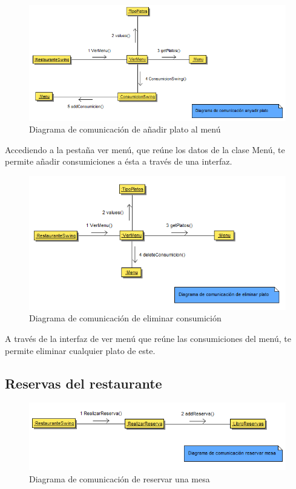 \documentclass[spanish,a4paper,11pt, twoside]{report}	%
\begin{document}
		\begin{figure}[!h]
		\centering
		\includegraphics[scale=0.65]{DCanyadirconsumicion.png}
		\caption{Diagrama de comunicación de añadir plato al menú}
		\end{figure}
		Accediendo a la pestaña ver menú, que reúne los datos de la clase Menú, te
		permite añadir consumiciones a ésta a través de una interfaz.

		\begin{figure}[!h]
		\centering
		\includegraphics[scale=0.65]{DCeliminarconsumicion.png}
		\caption{Diagrama de comunicación de eliminar consumición}
		\end{figure}
		A través de la interfaz de ver menú que reúne las consumiciones del menú, te permite
		eliminar cualquier plato de este.


		\subsection{Reservas del restaurante}
		\hspace{0.5cm}
		\begin{figure}[!h]
		\centering
		\includegraphics[scale=0.6]{DCreserva.png}
		\caption{Diagrama de comunicación de reservar una mesa}
		\end{figure}
\end{document}
